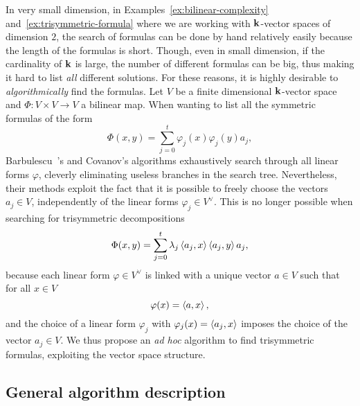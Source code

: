 In very small dimension, \eg in Examples~\ref{ex:bilinear-complexity}
and~\ref{ex:trisymmetric-formula} where we are working with $\mathbf{k}$-vector spaces
of dimension $2$, the search of formulas can be done by hand relatively easily
because the length of the formulas is short. Though, even in small dimension, if
the cardinality of $\mathbf{k}$ is large, the number of different formulas can be
big, thus making it hard to list \emph{all} different solutions. For these
reasons, it is highly desirable to \emph{algorithmically} find the formulas.
Let $V$ be a finite dimensional $\mathbf{k}$-vector space and $\Phi:V\times V\to V$ a bilinear map.
When wanting to list all the symmetric formulas of the form
\[
  \Phi(x, y) = \sum_{j=0}^t\varphi_j(x)\varphi_j(y)a_j,
\]
Barbulescu~\etal\!\!\!'s and Covanov's algorithms exhaustively search through
all linear forms $\varphi$, cleverly eliminating useless branches in the search
tree. Nevertheless, their methods exploit the fact that it is possible to freely
choose the vectors $a_j\in V$, independently of the linear forms $\varphi_j\in
V^\vee$. This is
no longer possible when searching for trisymmetric decompositions
\[
  \Phi(x, y) = \sum_{j=0}^t\lambda_j\left\langle a_j,x\right\rangle\left\langle a_j,y\right\rangle a_j,
\]
because each
linear form $\varphi\in V^\vee$ is linked with a unique vector $a\in V$ such
that for all $x\in V$
\[
  \varphi(x) = \left\langle a,x\right\rangle,
\]
and the choice of a linear form $\varphi_j$ with $\varphi_j(x)=\left\langle a_j,x\right\rangle$
imposes the choice of the vector $a_j\in V$. We thus propose an \emph{ad hoc}
algorithm to find trisymmetric formulas, exploiting the vector space structure.

%
%
%

\subsection{General algorithm description}

